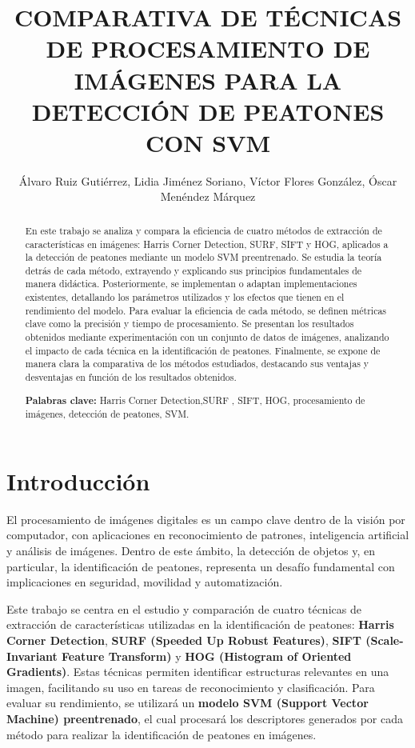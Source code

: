\documentclass[a4paper]{article}
\title{COMPARATIVA DE TÉCNICAS DE PROCESAMIENTO DE IMÁGENES PARA LA DETECCIÓN DE PEATONES CON SVM}
\author{Álvaro Ruiz Gutiérrez, Lidia Jiménez Soriano, Víctor Flores González, Óscar Menéndez Márquez}
\begin{document}
\maketitle

\begin{abstract}
  \noindent En este trabajo se analiza y compara la eficiencia de cuatro métodos de extracción de características en imágenes: Harris Corner Detection, SURF, SIFT y HOG, aplicados a la detección de peatones mediante un modelo SVM preentrenado. 
  Se estudia la teoría detrás de cada método, extrayendo y explicando sus principios fundamentales de manera didáctica. Posteriormente, se implementan o adaptan implementaciones existentes, 
  detallando los parámetros utilizados y los efectos que tienen en el rendimiento del modelo. Para evaluar la eficiencia de cada método, se definen métricas clave como la precisión y tiempo de procesamiento. 
  Se presentan los resultados obtenidos mediante experimentación con un conjunto de datos de imágenes, analizando el impacto de cada técnica en la identificación de peatones. Finalmente, se expone de manera clara la 
  comparativa de los métodos estudiados, destacando sus ventajas y desventajas en función de los resultados obtenidos.  
 
 \hspace{1cm}
 
 \noindent \textbf{Palabras clave:} 
 Harris Corner Detection,SURF , SIFT, HOG, procesamiento de imágenes, detección de peatones, SVM.
 \end{abstract}
 


 \section{Introducción}

 El procesamiento de imágenes digitales es un campo clave dentro de la visión por computador, con aplicaciones en reconocimiento de patrones, inteligencia artificial y análisis de imágenes. Dentro de este ámbito, la detección de objetos y, en particular, la identificación de peatones, representa un desafío fundamental con implicaciones en seguridad, movilidad y automatización. 
 \par \hspace{1cm}

 Este trabajo se centra en el estudio y comparación de cuatro técnicas de extracción de características utilizadas en la identificación de peatones: \textbf{Harris Corner Detection}, \textbf{SURF (Speeded Up Robust Features)}, \textbf{SIFT (Scale-Invariant Feature Transform)} y \textbf{HOG (Histogram of Oriented Gradients)}. Estas técnicas permiten identificar estructuras relevantes en una imagen, facilitando su uso en tareas de reconocimiento y clasificación. Para evaluar su rendimiento, se utilizará un \textbf{modelo SVM (Support Vector Machine) preentrenado}, el cual procesará los descriptores generados por cada método para realizar la identificación de peatones en imágenes. 
 \par \hspace{1cm}
\end{document}
